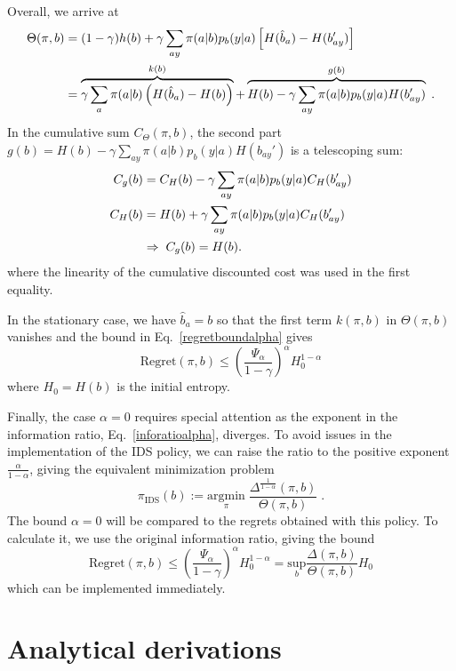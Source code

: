\documentclass[aps,nofootinbib,groupaddress,superscriptaddress,reprint,amsmath,amssymb,graphicx,onecolumn,prx]{revtex4-2}
\begin{document}
Overall, we arrive at 
\begin{align}
    \Theta(\pi,b)&=(1-\gamma)h(b)+\gamma\sum_{ay}\pi(a|b)p_b(y|a)\left[H(\hat{b}_a)-H(b_{ay}')\right] \notag\\
    &= \overbrace{\gamma\sum_a \pi(a|b)\left(H(\hat{b}_a)-H(b)\right)}^{k(b)} +  \overbrace{H(b)-\gamma\sum_{ay} \pi(a|b)p_b (y|a)H(b_{ay}')}^{g(b)} \; .
    \label{infofunction}
\end{align}
In the cumulative sum $C_\Theta (\pi,b)$, the second part $g(b)= H(b)-\gamma\sum_{ay} \pi(a|b)p_b (y|a)H(b_{ay}')$ is a telescoping sum:
\begin{align}
    C_g(b)&=C_H(b)-\gamma\sum_{ay}\pi(a|b)p_b(y|a)C_H(b_{ay}') \notag \\
    C_H(b)&=H(b)+\gamma\sum_{ay}\pi(a|b)p_b(y|a)C_H(b_{ay}') \notag \\
    &\Rightarrow \; C_g(b)=H(b).
\end{align}
where the linearity of the cumulative discounted cost was used in the first equality. 

In the stationary case, we have $\hat{b}_a=b$ so that the first term $k(\pi,b)$ in $\Theta(\pi,b)$ vanishes and the bound in Eq.~\eqref{regretboundalpha} gives 
\begin{equation}
    \text{Regret}(\pi,b)\leq\left(\frac{\Psi_\alpha}{1-\gamma} \right)^\alpha H_0^{1-\alpha}
\end{equation}
where $H_0=H(b)$ is the initial entropy. 

Finally, the case $\alpha=0$ requires special attention as the exponent in the information ratio, Eq.~\eqref{inforatioalpha}, diverges. To avoid issues in the implementation of the IDS policy, we can raise the ratio to the positive exponent $\frac{\alpha}{1-\alpha}$, giving the equivalent minimization problem
\begin{equation}
    \pi_\mathrm{IDS}(b):=\underset{\pi}{\text{argmin}}\; \frac{\Delta^{\frac{1}{1-\alpha}}(\pi,b)}{\Theta(\pi,b)} \; .
\end{equation}
The bound $\alpha=0$ will be compared to the regrets obtained with this policy. To calculate it, we use the original information ratio, giving the bound
\begin{equation}
\text{Regret}(\pi,b)\leq\left(\frac{\Psi_\alpha}{1-\gamma} \right)^\alpha H_0^{1-\alpha}=\underset{b}{\text{sup}}\frac{\Delta(\pi,b)}{\Theta(\pi,b)}H_0
\label{eq:alpha0bound}
\end{equation}
which can be implemented immediately.


\section{Analytical derivations}
\label{app:analytics}
\end{document}
